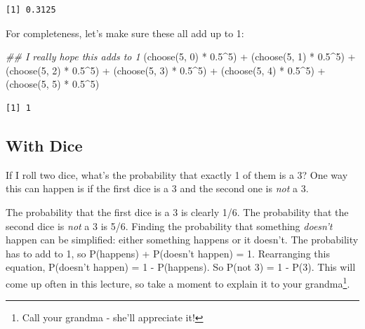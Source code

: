 \documentclass[
  letterpaper,
  DIV=11,
  numbers=noendperiod,
  oneside]{scrreprt}
\newenvironment{Shaded}{\begin{snugshade}}{\end{snugshade}}
\newcommand{\DecValTok}[1]{\textcolor[rgb]{0.68,0.00,0.00}{#1}}
\newcommand{\DocumentationTok}[1]{\textcolor[rgb]{0.37,0.37,0.37}{\textit{#1}}}
\newcommand{\FloatTok}[1]{\textcolor[rgb]{0.68,0.00,0.00}{#1}}
\newcommand{\FunctionTok}[1]{\textcolor[rgb]{0.28,0.35,0.67}{#1}}
\newcommand{\NormalTok}[1]{\textcolor[rgb]{0.00,0.23,0.31}{#1}}
\newcommand{\SpecialCharTok}[1]{\textcolor[rgb]{0.37,0.37,0.37}{#1}}
\begin{document}
\begin{verbatim}
[1] 0.3125
\end{verbatim}

For completeness, let's make sure these all add up to 1:

\begin{Shaded}
\begin{Highlighting}[]
\DocumentationTok{\#\# I really hope this adds to 1}
\NormalTok{(}\FunctionTok{choose}\NormalTok{(}\DecValTok{5}\NormalTok{, }\DecValTok{0}\NormalTok{) }\SpecialCharTok{*} \FloatTok{0.5}\SpecialCharTok{\^{}}\DecValTok{5}\NormalTok{) }\SpecialCharTok{+}
\NormalTok{  (}\FunctionTok{choose}\NormalTok{(}\DecValTok{5}\NormalTok{, }\DecValTok{1}\NormalTok{) }\SpecialCharTok{*} \FloatTok{0.5}\SpecialCharTok{\^{}}\DecValTok{5}\NormalTok{) }\SpecialCharTok{+}
\NormalTok{  (}\FunctionTok{choose}\NormalTok{(}\DecValTok{5}\NormalTok{, }\DecValTok{2}\NormalTok{) }\SpecialCharTok{*} \FloatTok{0.5}\SpecialCharTok{\^{}}\DecValTok{5}\NormalTok{) }\SpecialCharTok{+}
\NormalTok{  (}\FunctionTok{choose}\NormalTok{(}\DecValTok{5}\NormalTok{, }\DecValTok{3}\NormalTok{) }\SpecialCharTok{*} \FloatTok{0.5}\SpecialCharTok{\^{}}\DecValTok{5}\NormalTok{) }\SpecialCharTok{+}
\NormalTok{  (}\FunctionTok{choose}\NormalTok{(}\DecValTok{5}\NormalTok{, }\DecValTok{4}\NormalTok{) }\SpecialCharTok{*} \FloatTok{0.5}\SpecialCharTok{\^{}}\DecValTok{5}\NormalTok{) }\SpecialCharTok{+}
\NormalTok{  (}\FunctionTok{choose}\NormalTok{(}\DecValTok{5}\NormalTok{, }\DecValTok{5}\NormalTok{) }\SpecialCharTok{*} \FloatTok{0.5}\SpecialCharTok{\^{}}\DecValTok{5}\NormalTok{)}
\end{Highlighting}
\end{Shaded}

\begin{verbatim}
[1] 1
\end{verbatim}

\hypertarget{with-dice}{%
\subsection{With Dice}\label{with-dice}}

If I roll two dice, what's the probability that exactly 1 of them is a
3? One way this can happen is if the first dice is a 3 and the second
one is \emph{not} a 3.

The probability that the first dice is a 3 is clearly 1/6. The
probability that the second dice is \emph{not} a 3 is 5/6. Finding the
probability that something \emph{doesn't} happen can be simplified:
either something happens or it doesn't. The probability has to add to 1,
so P(happens) + P(doesn't happen) = 1. Rearranging this equation,
P(doesn't happen) = 1 - P(happens). So P(not 3) = 1 - P(3). This will
come up often in this lecture, so take a moment to explain it to your
grandma\footnote{Call your grandma - she'll appreciate it!}.
\end{document}
